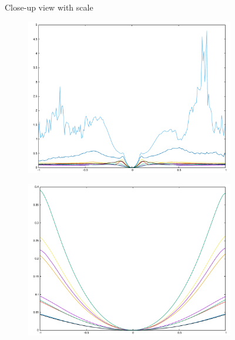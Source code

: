 {\begin{figure}[h]
\center
{
\setlength{\fboxsep}{0pt}%
\setlength{\fboxrule}{0.5pt}%
}
\caption{Close-up view with scale}
\label{fig:t_scale}
\end{figure}

\begin{figure}[H]
\begin{subfigure}{.33\textwidth}
	\includegraphics[width=\linewidth]{fig/ajherr/t/L_chi.pdf}
\end{subfigure}%
\begin{subfigure}{.33\textwidth}
	\includegraphics[width=\linewidth]{fig/ajherr/t/M_chi.pdf}

\end{subfigure}
\end{figure}}
